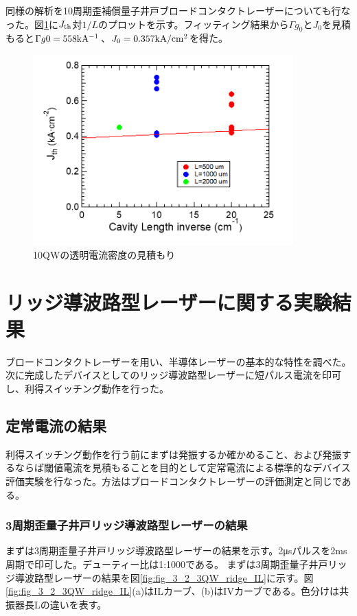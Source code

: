 {同様の解析を10周期歪補償量子井戸ブロードコンタクトレーザーについても行なった。図\ref{fig:fig_3_1_10QW_broadcontact_j0}に$J_{\rm{th}}$対$1/L$のプロットを示す。フィッティング結果から$\Gamma g_{0}$と$J_{0}$を見積もると$\Gamma g0=558   \rm{kA^{-1}}$、$J_{0}=0.357 \rm{kA/cm^{2}}$を得た。
\begin{figure}[t]
	\centering
	\includegraphics[width=10cm]{figure/fig_3_1_10QW_broadcontact_j0.png}
	\caption{10QWの透明電流密度の見積もり}
	\label{fig:fig_3_1_10QW_broadcontact_j0}
\end{figure}

\clearpage
\section{リッジ導波路型レーザーに関する実験結果}%
ブロードコンタクトレーザーを用い、半導体レーザーの基本的な特性を調べた。次に完成したデバイスとしてのリッジ導波路型レーザーに短パルス電流を印可し、利得スイッチング動作を行った。
\subsection{定常電流の結果}

利得スイッチング動作を行う前にまずは発振するか確かめること、および発振するならば閾値電流を見積もることを目的として定常電流による標準的なデバイス評価実験を行なった。方法はブロードコンタクトレーザーの評価測定と同じである。
\subsubsection{3周期歪量子井戸リッジ導波路型レーザーの結果}
まずは3周期歪量子井戸リッジ導波路型レーザーの結果を示す。2\si{\micro s}パルスを2ms周期で印可した。デューティー比は1:1000である。
まずは3周期歪量子井戸リッジ導波路型レーザーの結果を図\ref{fig:fig_3_2_3QW_ridge_IL}に示す。図\ref{fig:fig_3_2_3QW_ridge_IL}(a)はILカーブ、(b)はIVカーブである。色分けは共振器長Lの違いを表す。

}
